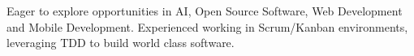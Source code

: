 \vspace{1pc}

\begin{center}
	\noindent Eager to explore opportunities in AI, Open Source Software, Web Development and Mobile Development. Experienced working in Scrum/Kanban environments, leveraging TDD to build world class software.
	
\end{center}
\vspace{1pc}